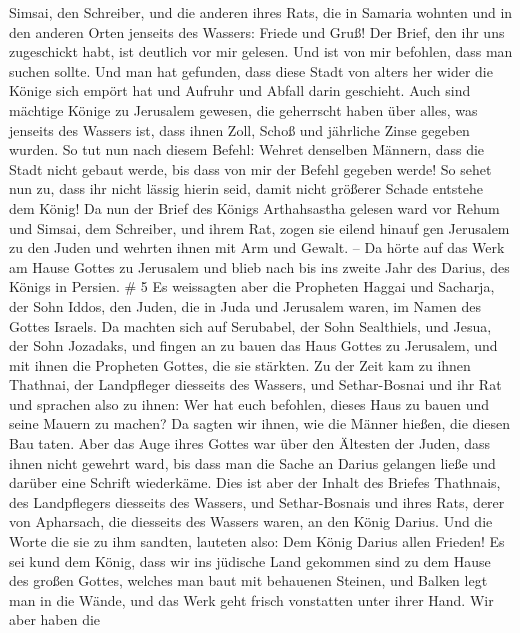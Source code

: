 Simsai, den Schreiber, und die anderen ihres Rats, die in Samaria
wohnten und in den anderen Orten jenseits des Wassers: Friede und Gruß!
 Der Brief, den ihr uns zugeschickt habt, ist deutlich vor
mir gelesen.  Und ist von mir befohlen, dass man suchen
sollte. Und man hat gefunden, dass diese Stadt von alters her wider die
Könige sich empört hat und Aufruhr und Abfall darin geschieht.
 Auch sind mächtige Könige zu Jerusalem gewesen, die
geherrscht haben über alles, was jenseits des Wassers ist, dass ihnen
Zoll, Schoß und jährliche Zinse gegeben wurden.  So tut nun
nach diesem Befehl: Wehret denselben Männern, dass die Stadt nicht
gebaut werde, bis dass von mir der Befehl gegeben werde! 
So sehet nun zu, dass ihr nicht lässig hierin seid, damit nicht größerer
Schade entstehe dem König!  Da nun der Brief des Königs
Arthahsastha gelesen ward vor Rehum und Simsai, dem Schreiber, und ihrem
Rat, zogen sie eilend hinauf gen Jerusalem zu den Juden und wehrten
ihnen mit Arm und Gewalt. --  Da hörte auf das Werk am
Hause Gottes zu Jerusalem und blieb nach bis ins zweite Jahr des Darius,
des Königs in Persien. \# 5  Es weissagten aber die
Propheten Haggai und Sacharja, der Sohn Iddos, den Juden, die in Juda
und Jerusalem waren, im Namen des Gottes Israels.  Da
machten sich auf Serubabel, der Sohn Sealthiels, und Jesua, der Sohn
Jozadaks, und fingen an zu bauen das Haus Gottes zu Jerusalem, und mit
ihnen die Propheten Gottes, die sie stärkten.  Zu der Zeit
kam zu ihnen Thathnai, der Landpfleger diesseits des Wassers, und
Sethar-Bosnai und ihr Rat und sprachen also zu ihnen: Wer hat euch
befohlen, dieses Haus zu bauen und seine Mauern zu machen? 
Da sagten wir ihnen, wie die Männer hießen, die diesen Bau taten.
 Aber das Auge ihres Gottes war über den Ältesten der Juden,
dass ihnen nicht gewehrt ward, bis dass man die Sache an Darius gelangen
ließe und darüber eine Schrift wiederkäme.  Dies ist aber
der Inhalt des Briefes Thathnais, des Landpflegers diesseits des
Wassers, und Sethar-Bosnais und ihres Rats, derer von Apharsach, die
diesseits des Wassers waren, an den König Darius.  Und die
Worte die sie zu ihm sandten, lauteten also: Dem König Darius allen
Frieden!  Es sei kund dem König, dass wir ins jüdische Land
gekommen sind zu dem Hause des großen Gottes, welches man baut mit
behauenen Steinen, und Balken legt man in die Wände, und das Werk geht
frisch vonstatten unter ihrer Hand.  Wir aber haben die

